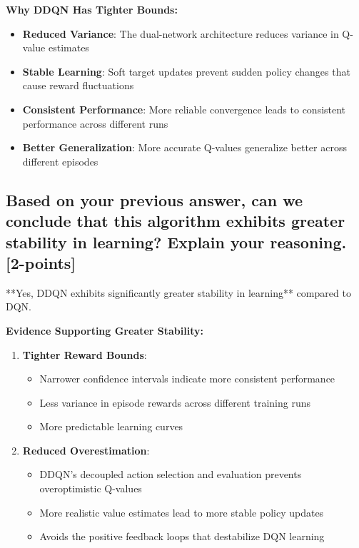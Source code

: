 \documentclass[12pt]{article}
\begin{document}
{{{\textbf{Why DDQN Has Tighter Bounds:}
\begin{itemize}
    \item \textbf{Reduced Variance}: The dual-network architecture reduces variance in Q-value estimates
    \item \textbf{Stable Learning}: Soft target updates prevent sudden policy changes that cause reward fluctuations
    \item \textbf{Consistent Performance}: More reliable convergence leads to consistent performance across different runs
    \item \textbf{Better Generalization}: More accurate Q-values generalize better across different episodes
\end{itemize}

\subsection{Based on your previous answer, can we conclude that this algorithm exhibits greater stability in learning? Explain your reasoning. [2-points]}

**Yes, DDQN exhibits significantly greater stability in learning** compared to DQN.

\textbf{Evidence Supporting Greater Stability:}

\begin{enumerate}
    \item \textbf{Tighter Reward Bounds}:
    \begin{itemize}
        \item Narrower confidence intervals indicate more consistent performance
        \item Less variance in episode rewards across different training runs
        \item More predictable learning curves
    \end{itemize}
    
    \item \textbf{Reduced Overestimation}:
    \begin{itemize}
        \item DDQN's decoupled action selection and evaluation prevents overoptimistic Q-values
        \item More realistic value estimates lead to more stable policy updates
        \item Avoids the positive feedback loops that destabilize DQN learning
    \end{itemize}
    

\end{enumerate}}}}
\end{document}
